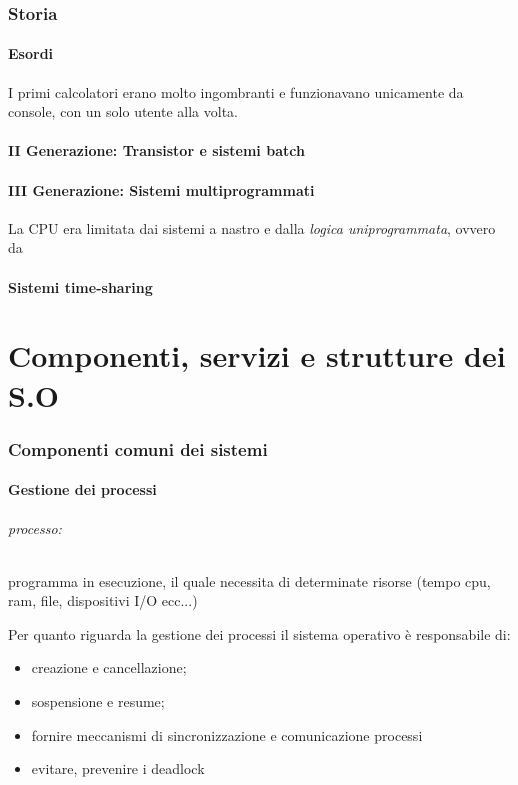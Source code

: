 \documentclass{article}
\begin{document}
\section{Storia}
\subsection{Esordi}
I primi calcolatori erano molto ingombranti 
e funzionavano unicamente da console, con un solo utente alla volta.
\subsection{II Generazione: Transistor  e sistemi batch} 

\subsection{III Generazione: Sistemi multiprogrammati}
La CPU era limitata dai sistemi a nastro e dalla \textit{logica uniprogrammata}, ovvero da
\subsection{Sistemi time-sharing}


\part{Componenti, servizi e strutture dei S.O}

\section{Componenti comuni dei sistemi}
\subsection{Gestione dei processi}
\paragraph{processo:} programma in esecuzione, il quale necessita di determinate risorse (tempo cpu, ram, file, dispositivi I/O ecc...)

Per quanto riguarda la gestione dei processi il sistema operativo è responsabile di:
\begin{itemize}
    \item creazione e cancellazione;
    \item sospensione e resume;
    \item fornire meccanismi di sincronizzazione e comunicazione processi
    \item evitare, prevenire i deadlock
\end{itemize}
\end{document}
